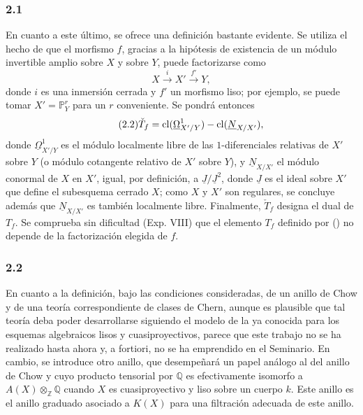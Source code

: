 \subsubsection*{2.1}
En cuanto a este último, se ofrece una definición bastante evidente. Se
utiliza el hecho de que el morfismo $f$, gracias a la hipótesis de existencia
de un módulo invertible amplio sobre $X$ y sobre $Y$, puede factorizarse como
\begin{equation}\tag{2.1}
X\xrightarrow{i}X'\xrightarrow{f'}Y,
\end{equation}
donde $i$ es una inmersión cerrada y $f'$ un morfismo liso; por ejemplo, se
puede tomar $X'=\mathbb P^r_Y$ para un $r$ conveniente. Se pondrá entonces
\begin{equation}\tag{2.2}
\check T_f=\operatorname{cl}({\underline\Omega}^1_{X'/Y})-\operatorname{cl}({\underline N}_{X/X'}),
\end{equation}
donde ${\underline\Omega}^1_{X'/Y}$ es el módulo localmente libre de las
$1$-diferenciales relativas de $X'$ sobre $Y$ (o módulo cotangente relativo
de $X'$ sobre $Y$), y ${\underline N}_{X/X'}$ el módulo conormal de $X$ en
$X'$, igual, por definición, a ${\underline J}/{\underline J}^2$, donde
${\underline J}$ es el ideal sobre $X'$ que define el subesquema cerrado
$X$; como $X$ y $X'$ son regulares, se concluye además que
${\underline N}_{X/X'}$ es también localmente libre. Finalmente,
$\check T_f$ designa el dual de $T_f$. Se comprueba sin dificultad (Exp.
VIII) que el elemento $T_f$ definido por () no depende de la %
factorización elegida de $f$.

\subsubsection*{2.2}
En cuanto a la definición, bajo las condiciones consideradas, de un anillo
de Chow y de una teoría correspondiente de clases de Chern, aunque es
plausible que tal teoría deba poder desarrollarse siguiendo el modelo de la
ya conocida para los esquemas algebraicos lisos y cuasiproyectivos, parece
que este trabajo no se ha realizado hasta ahora y, a fortiori, no se ha
emprendido en el Seminario. En cambio, se introduce otro anillo, que
desempeñará un papel análogo al del anillo de Chow y cuyo producto tensorial
por $\mathbb Q$ es efectivamente isomorfo a
$A(X)\otimes_{\mathbb Z}\mathbb Q$ cuando $X$ es cuasiproyectivo y liso
sobre un cuerpo $k$. Este anillo es el anillo graduado asociado a $K(X)$
para una filtración adecuada de este anillo.

